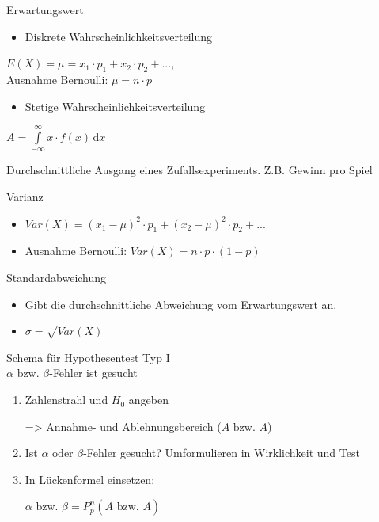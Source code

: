 \documentclass[paper=a6,landscape,ngerman,twoside=true,fontsize=12pt]{scrartcl}
\begin{document}
\begin{frage}
	Erwartungswert
\end{frage}
\begin{antwort}
	\begin{itemize}
		\item Diskrete Wahrscheinlichkeitsverteilung
	\end{itemize}
	$E(X)=\mu=x_1 \cdot p_1 + x_2 \cdot p_2 + ...$,\\
	Ausnahme Bernoulli: $\mu=n \cdot p$
	\begin{itemize}
		\item Stetige Wahrscheinlichkeitsverteilung
	\end{itemize}
	$A=\displaystyle\int\limits_{-\infty}^{\infty} \!x\cdot f(x) \, \mathrm{d}x$
	
	Durchschnittliche Ausgang eines Zufallsexperiments.
	Z.B. Gewinn pro Spiel
\end{antwort}	
\begin{frage}
	Varianz
	
\end{frage}
\begin{antwort}
	\begin{itemize}
		\item $Var(X)=(x_1-\mu)^2 \cdot p_1+(x_2-\mu)^2 \cdot p_2+...$	
		\item Ausnahme Bernoulli: $Var(X)=n \cdot p \cdot (1-p)$	
	\end{itemize}	
\end{antwort}	
\begin{frage}
	Standardabweichung
	
\end{frage}
\begin{antwort}
	\begin{itemize}
		\item Gibt die durchschnittliche Abweichung vom Erwartungswert an.		
		\item $\sigma=\sqrt{Var(X)}$	
	\end{itemize}	
\end{antwort}	
\begin{frage}
	Schema für Hypothesentest Typ I\\
	$\alpha \text{ bzw. }\beta$-Fehler ist gesucht
	
\end{frage}
\begin{antwort}
	\begin{enumerate}
		\item Zahlenstrahl und $H_0$ angeben
		
		=> Annahme- und Ablehnungsbereich  ($A \text{ bzw. }\overline{A}$)	
		\item Ist  $\alpha \text{ oder }\beta$-Fehler gesucht? Umformulieren in Wirklichkeit und Test
		\item In Lückenformel einsetzen: 
		
		$\alpha \text{ bzw. }\beta=P^n_p(A\text{ bzw. }\overline{A})$	
	\end{enumerate}
	
\end{antwort}	
\end{document}
